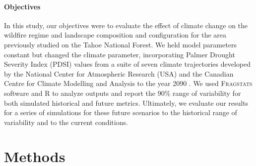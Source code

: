 \documentclass[12pt]{article}
\begin{document}
\begin{spacing}{1}
\paragraph{Objectives}
In this study, our objectives were to evaluate the effect of climate change on the wildfire regime and landscape composition and configuration for the area previously studied on the Tahoe National Forest. We held model parameters constant but changed the climate parameter, incorporating Palmer Drought Severity Index (PDSI) values from a suite of seven climate trajectories developed by the National Center for Atmospheric Research (USA) and the Canadian Centre for Climate Modelling and Analysis to the year 2090 \citep{Cook2014}. We used \textsc{Fragstats} software and R to analyze outputs and report the 90\% range of variability for both simulated historical and future metrics. Ultimately, we evaluate our results for a series of simulations for these future scenarios to the historical range of variability and to the current conditions. 


















\section{Methods}


\end{spacing}
\end{document}
